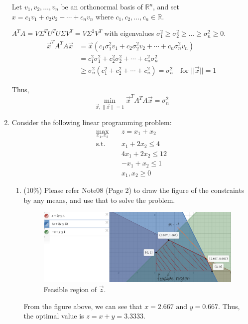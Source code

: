 \documentclass[a4paper,10pt]{article}
\begin{document}
\begin{enumerate}
{\color{blue}
    Let $v_1, v_2, \ldots, v_n$ be an orthonormal basis of $\mathbb{R}^n$, 
    and set $x = c_1v_1 + c_2v_2 + \cdots + c_n v_n$ where $c_1, c_2, \ldots, c_n \in \mathbb{R}$.

    $A^T A = V \Sigma^T U^T U \Sigma V^T = V \Sigma^2 V^T$ with eigenvalues $\sigma_1^2 \geq \sigma_2^2 \geq \ldots \geq \sigma_n^2 \geq 0$.
    \begin{align}
        \vec{x}^T A^T A \vec{x} &= \vec{x} (c_1 \sigma_1^2 v_1 + c_2 \sigma_2^2 v_2 + \cdots + c_n \sigma_n^2 v_n) \\
        &= c_1^2 \sigma_1^2 + c_2^2 \sigma_2^2 + \cdots + c_n^2 \sigma_n^2 \\
        &\geq \sigma_n^2(c_1^2 + c_2^2 + \cdots + c_n^2) = \sigma_n^2 \quad \text{for } ||\vec{x}|| = 1
    \end{align}

    Thus,
    \[
        \min_{\vec{x}, \|\vec{x}\|=1} \vec{x}^T A^T A \vec{x} = \sigma_n^2
    \]
}

\item Consider the following linear programming problem:
    \begin{equation}
        \begin{aligned}
            \max_{x_1,x_2} \quad & z=x_1+x_2 \\
            \textrm{s.t.} \quad & x_1 + 2x_2 \le 4  \\
                \quad& 4x_1 + 2x_2 \le 12   \\
                \quad& -x_1 + x_2 \le 1   \\
                \quad& x_1, x_2 \ge 0
        \end{aligned}
    \end{equation}

    \begin{enumerate}
        \item (10\%) Please refer Note08 (Page 2) to draw the figure of the constraints by any means, and use that to solve the problem. 
        \begin{figure}[H]
            \centering
            \includegraphics[scale=0.15]{./4a.png}
            \caption{Feasible region of $\vec{z}$.}
        \end{figure}
        {\color{blue}
            From the figure above, we can see that  $x = 2.667 \text{ and } y = 0.667$. 
            Thus, the optimal value is $z = x + y = 3.3333$.
        }


\end{enumerate}
\end{enumerate}
\end{document}
